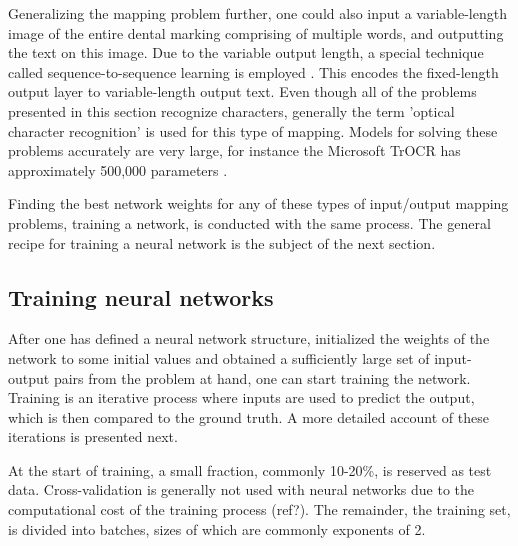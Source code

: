\documentclass{article}
\begin{document}
Generalizing the mapping problem further, one could also input a variable-length image 
of the entire dental marking comprising of multiple words, and outputting the text on this image.
Due to the variable output length, a special technique called sequence-to-sequence learning 
is employed \cite{sutskever2014sequence}. This encodes the fixed-length output layer to variable-length 
output text. Even though all of the problems presented in this section recognize characters, 
generally the term 'optical character recognition' is used for this type of mapping. Models
for solving these problems accurately are very large, for instance the Microsoft TrOCR has approximately 
500,000 parameters \cite{li2021trocr}.

Finding the best network weights for any of these types of input/output mapping problems, training 
a network, is conducted with the same process.
The general recipe for training a neural network is the subject of the next section.

\subsection{Training neural networks}

After one has defined a neural network structure, initialized the weights of the network 
to some initial values and obtained a sufficiently large set of input-output pairs from the problem at hand,
one can start training the network. Training is an iterative process where inputs are used to 
predict the output, which is then compared to the ground truth. A more detailed account of these iterations
is presented next.

At the start of training, a small fraction, commonly 10-20\%, is reserved as test data. Cross-validation is 
generally not used with neural networks due to the computational cost of the training process (ref?). The remainder, 
the training set, is divided into batches, sizes of which are commonly exponents of 2.
\end{document}
